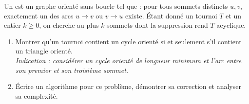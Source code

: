\begin{td-exo}
    Un  est un graphe orienté sans boucle tel que : pour tous sommets distincts \(u, v\), exactement un des arcs \(u\to v\) ou \(v\to u\) existe.
    Étant donné un tournoi \(T\) et un entier \(k\geq 0\), on cherche au plus \(k\) sommets dont la suppression rend \(T\) acyclique.

    \begin{enumerate}
        \item Montrer qu'un tournoi contient un cycle orienté si et seulement s'il contient un triangle orienté.\\
        \textit{Indication : considérer un cycle orienté de longueur minimum et l'arc entre son premier et son troisième sommet.}

        \item Écrire un algorithme  pour ce problème, démontrer sa correction et analyser sa complexité.
    \end{enumerate}

\end{td-exo}

